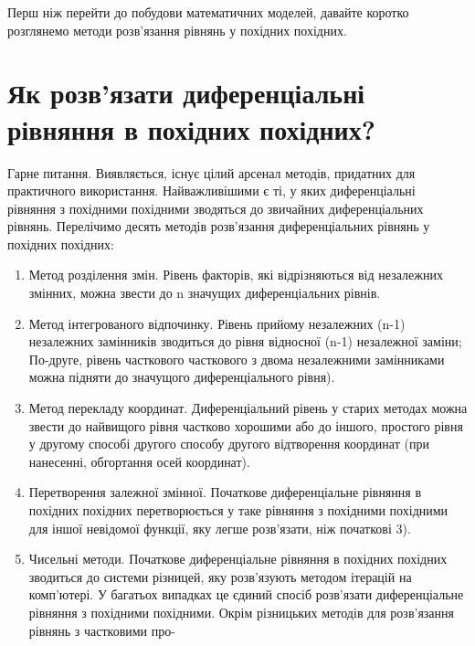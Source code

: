 \documentclass[
  ukrainian,
]{article}
\begin{document}
Перш ніж перейти до побудови математичних моделей, давайте коротко
розглянемо методи розв'язання рівнянь у похідних похідних.

\section{Як розв'язати диференціальні рівняння в похідних
похідних?}\label{ux44fux43a-ux440ux43eux437ux432ux44fux437ux430ux442ux438-ux434ux438ux444ux435ux440ux435ux43dux446ux456ux430ux43bux44cux43dux456-ux440ux456ux432ux43dux44fux43dux43dux44f-ux432-ux43fux43eux445ux456ux434ux43dux438ux445-ux43fux43eux445ux456ux434ux43dux438ux445}

Гарне питання. Виявляється, існує цілий арсенал методів, придатних для
практичного використання. Найважливішими є ті, у яких диференціальні
рівняння з похідними похідними зводяться до звичайних диференціальних
рівнянь. Перелічимо десять методів розв'язання диференціальних рівнянь у
похідних похідних:

\begin{enumerate}
\def\labelenumi{\arabic{enumi}.}
\item
  Метод розділення змін. Рівень факторів, які відрізняються від
  незалежних змінних, можна звести до n значущих диференціальних рівнів.
\item
  Метод інтегрованого відпочинку. Рівень прийому незалежних (n-1)
  незалежних замінників зводиться до рівня відносної (n-1) незалежної
  заміни; По-друге, рівень часткового часткового з двома незалежними
  замінниками можна підняти до значущого диференціального рівня).
\item
  Метод перекладу координат. Диференціальний рівень у старих методах
  можна звести до найвищого рівня частково хорошими або до іншого,
  простого рівня у другому способі другого способу другого відтворення
  координат (при нанесенні, обгортання осей координат).
\item
  Перетворення залежної змінної. Початкове диференціальне рівняння в
  похідних похідних перетворюється у таке рівняння з похідними похідними
  для іншої невідомої функції, яку легше розв'язати, ніж початкові 3).
\item
  Чисельні методи. Початкове диференціальне рівняння в похідних похідних
  зводиться до системи різницей, яку розв'язують методом ітерацій на
  комп'ютері. У багатьох випадках це єдиний спосіб розв'язати
  диференціальне рівняння з похідними похідними. Окрім різницьких
  методів для розв'язання рівнянь з частковими про-
\end{enumerate}
\end{document}
